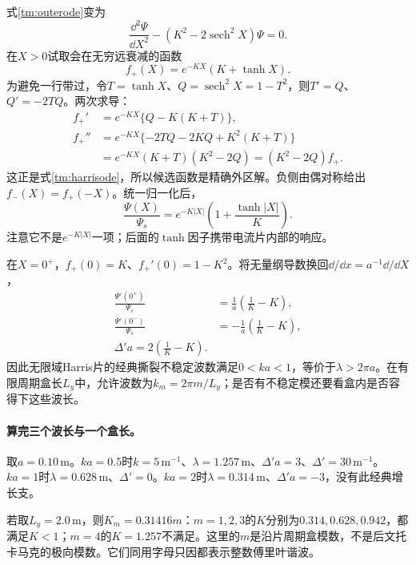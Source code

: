 式\eqref{tm:outerode}变为
\begin{equation}
 \frac{\dd^2\Psi}{\dd X^2}-\left(K^2-2\operatorname{sech}^2X\right)\Psi=0.
 \label{tm:harrisode}
\end{equation}
在$X>0$试取会在无穷远衰减的函数
\begin{equation}
 f_+(X)=e^{-KX}(K+\tanh X).
\end{equation}
为避免一行带过，令$T=\tanh X$、$Q=\operatorname{sech}^2X=1-T^2$，则$T'=Q$、$Q'=-2TQ$。两次求导：
\begin{align}
 f_+'&=e^{-KX}\{Q-K(K+T)\},\\
 f_+''&=e^{-KX}\{-2TQ-2KQ+K^2(K+T)\}\\
 &=e^{-KX}(K+T)(K^2-2Q)=(K^2-2Q)f_+.
\end{align}
这正是式\eqref{tm:harrisode}，所以候选函数是精确外区解。负侧由偶对称给出$f_-(X)=f_+(-X)$。统一归一化后，
\begin{equation}
 \frac{\Psi(X)}{\Psi_s}=e^{-K|X|}\left(1+\frac{\tanh|X|}{K}\right).
 \label{tm:harrissolution}
\end{equation}
注意它不是$e^{-K|X|}$一项；后面的$\tanh$因子携带电流片内部的响应。

在$X=0^+$，$f_+(0)=K$、$f_+'(0)=1-K^2$。将无量纲导数换回$\dd/\dd x=a^{-1}\dd/\dd X$，
\begin{align}
 \frac{\Psi'(0^+)}{\Psi_s}&=\frac{1}{a}\left(\frac1K-K\right),\\
 \frac{\Psi'(0^-)}{\Psi_s}&=-\frac{1}{a}\left(\frac1K-K\right),\\
 \boxed{\Delta'a=2\left(\frac1K-K\right).}
 \label{tm:harrisdelta}
\end{align}
因此无限域Harris片的经典撕裂不稳定波数满足$0<ka<1$，等价于$\lambda>2\pi a$。在有限周期盒长$L_y$中，允许波数为$k_m=2\pi m/L_y$；是否有不稳定模还要看盒内是否容得下这些波长。

\paragraph{算完三个波长与一个盒长。}
取$a=0.10\,\mathrm m$。$ka=0.5$时$k=5\,\mathrm{m^{-1}}$、$\lambda=1.257\,\mathrm m$、$\Delta'a=3$、$\Delta'=30\,\mathrm{m^{-1}}$。$ka=1$时$\lambda=0.628\,\mathrm m$、$\Delta'=0$。$ka=2$时$\lambda=0.314\,\mathrm m$、$\Delta'a=-3$，没有此经典增长支。

若取$L_y=2.0\,\mathrm m$，则$K_m=0.31416m$：$m=1,2,3$的$K$分别为$0.314,0.628,0.942$，都满足$K<1$；$m=4$的$K=1.257$不满足。这里的$m$是沿片周期盒模数，不是后文托卡马克的极向模数。它们同用字母只因都表示整数傅里叶谐波。

